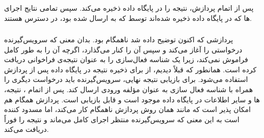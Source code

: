 \subsubsection*{}

پس از اتمام پردازش،  نتیجه را در پایگاه داده  ذخیره می‌کند. سپس تمامی نتایج اجرای  ها که در پایگاه داده ذخیره شده‌اند توسط  که به  ارسال شده بود، در دسترس هستند.

\subsubsection*{}

پردازشی که اکنون توضیح داده شد ناهمگام بود. بدان معنی که سرویس‌گیرنده درخواستی را آغاز می‌کند و سپس آن را کنار می‌گذارد، اگرچه آن را به طور کامل فراموش نمی‌کند، زیرا یک شناسه فعال‌سازی را به عنوان نتیجه‌ی فراخوانی دریافت کرده است. همانطور که قبلاً دیدیم، از  برای ذخیره نتیجه در پایگاه داده پس از پردازش استفاده می‌شود. برای بازیابی نتیجه نهایی، سرویس‌گیرنده باید درخواست دیگری را همراه با شناسه فعال سازی به عنوان مؤلفه ورودی ارسال کند. پس از اتمام ، نتیجه،  ها و سایر اطلاعات در پایگاه داده موجود است و قابل بازیابی است. پردازش همگام هم امکان پذیر است که مانند همان روش پردازش ناهمگام کار می‌کند، اما مسدود کننده است به این معنی که سرویس‌گیرنده منتظر اجرای کامل  می‌ماند و نتیجه را فوراً دریافت می‌کند.
